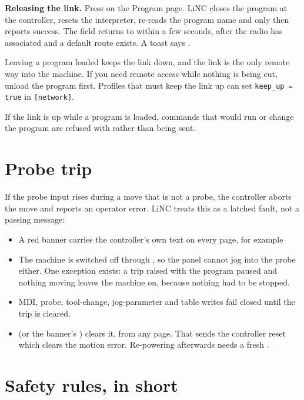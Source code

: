 \textbf{Releasing the link.} Press  on the Program page. LiNC
closes the program at the controller, resets the interpreter, re-reads the program name and
only then reports success. The  field returns to  within a few
seconds, after the radio has associated and a default route exists. A toast says
.

\begin{cautionbox}
  Leaving a program loaded keeps the link down, and the link is the only remote way into
  the machine. If you need remote access while nothing is being cut, unload the program
  first. Profiles that must keep the link up can set \texttt{keep\_up = true} in
  \texttt{[network]}.
\end{cautionbox}

If the link is up while a program is loaded, commands that would run or change the program
are refused with  rather than being sent.

\section{Probe trip}

If the probe input rises during a move that is not a probe, the controller aborts the move
and reports an operator error. LiNC treats this as a latched fault, not a passing message:

\begin{itemize}
  \item A red banner carries the controller's own text on every page, for example
  \item The machine is switched off through , so the panel cannot
        jog into the probe either. One exception exists: a trip raised with the program
        paused and nothing moving leaves the machine on, because nothing had to be stopped.
  \item MDI, probe, tool-change, jog-parameter and table writes fail closed until the trip
        is cleared.
  \item {} (or the banner's ) clears it, from any page. That sends the
        controller reset which clears the motion error. Re-powering afterwards needs a fresh
        .
\end{itemize}

\section{Safety rules, in short}

